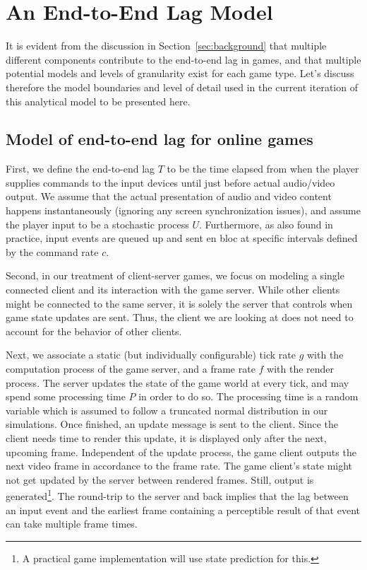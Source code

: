 \section{An End-to-End Lag Model}
\label{sec:model}

It is evident from the discussion in Section~\ref{sec:background} that multiple different components contribute to the end-to-end lag in games, and that multiple potential models and levels of granularity exist for each game type. Let's discuss therefore the model boundaries and level of detail used in the current iteration of this analytical model to be presented here.


\subsection{Model of end-to-end lag for online games}
First, we define the end-to-end lag $T$ to be the time elapsed from when the player supplies commands to the input devices until just before actual audio/video output.
We assume that the actual presentation of audio and video content happens instantaneously (ignoring any screen synchronization issues), and assume the player input to be a stochastic process $U$. %
Furthermore, as also found in practice, input events are queued up and sent en bloc at specific intervals defined by the command rate $c$.

Second, in our treatment of client-server games, we focus on modeling a single connected client and its interaction with the game server. While other clients might be connected to the same server, it is solely the server that controls when game state updates are sent. Thus, the client we are looking at does not need to account for the behavior of other clients.

Next, we associate a static (but individually configurable) tick rate $g$ with the computation process of the game server, and a frame rate $f$ with the render process. The server updates the state of the game world at every tick, and may spend some processing time $P$ in order to do so. The processing time is a random variable which is assumed to follow a truncated normal distribution in our simulations. Once finished, an update message is sent to the client. Since the client needs time to render this update, it is displayed only after the next, upcoming frame. Independent of the update process, the game client outputs the next video frame in accordance to the frame rate. The game client's state might not get updated by the server between rendered frames. Still, output is generated\footnote{A practical game implementation will use state prediction for this.}. The round-trip to the server and back implies that the lag between an input event and the earliest frame containing a perceptible result of that event can take multiple frame times.


